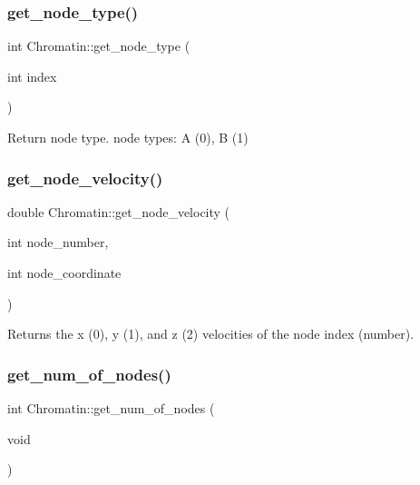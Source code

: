 \subsubsection{\texorpdfstring{get\_node\_type()}{get\_node\_type()}}
{\footnotesize\ttfamily int Chromatin\+::get\+\_\+node\+\_\+type (\begin{DoxyParamCaption}\item[{int}]{index }\end{DoxyParamCaption})\hspace{0.3cm}{\ttfamily [inline]}}

Return node type. node types\+: A (0), B (1) \mbox{\label{classChromatin_a8ba67062c2d842bacea17ade4d1545a3}} 
\subsubsection{\texorpdfstring{get\_node\_velocity()}{get\_node\_velocity()}}
{\footnotesize\ttfamily double Chromatin\+::get\+\_\+node\+\_\+velocity (\begin{DoxyParamCaption}\item[{int}]{node\+\_\+number,  }\item[{int}]{node\+\_\+coordinate }\end{DoxyParamCaption})\hspace{0.3cm}{\ttfamily [inline]}}

Returns the x (0), y (1), and z (2) velocities of the node index (number). \mbox{\label{classChromatin_ac944e4ee8639490da43597ba8d29efea}} 
\subsubsection{\texorpdfstring{get\_num\_of\_nodes()}{get\_num\_of\_nodes()}}
{\footnotesize\ttfamily int Chromatin\+::get\+\_\+num\+\_\+of\+\_\+nodes (\begin{DoxyParamCaption}\item[{void}]{ }\end{DoxyParamCaption})\hspace{0.3cm}{\ttfamily [inline]}}

\mbox{\label{classChromatin_acc1d78b2faf43df1720d1f7f503d3630}} 
